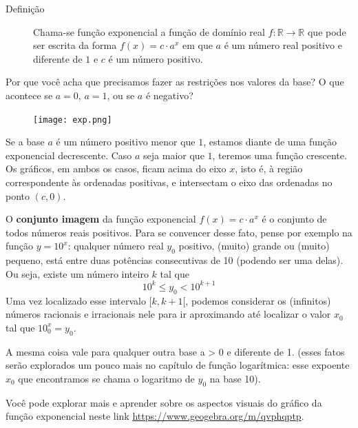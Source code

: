 \begin{description}
\item[Definição] Chama-se função exponencial a função de domínio real $f: \mathbb{R} \rightarrow \mathbb{R}$ que pode ser escrita da forma $f(x)= c \cdot a^{x}$ em que $a$ é um número real positivo e diferente de $1$ e $c$ é um número positivo.
\end{description}

\begin{reflection}

Por que você acha que precisamos  fazer as restrições nos valores da base? O que acontece se $a=0$, $a=1$, ou se $a$ é negativo?

\begin{figure}[H]
\centering
\texttt{[image: exp.png]}
\end{figure}

Se a base $a$ é um número positivo menor que $1$, estamos diante de uma função exponencial decrescente. Caso $a$ seja maior que $1$, teremos uma função crescente. Os gráficos, em ambos os casos, ficam acima do eixo $x$, isto é, à região correspondente às ordenadas positivas, e intersectam o eixo das ordenadas no ponto $(c,0)$.

O \textbf{conjunto imagem} da função exponencial $f(x) = c \cdot a^{x}$ é o conjunto de todos números reais positivos. Para se convencer desse fato, pense por exemplo na função $y = 10^x$: qualquer número real $y_0$ positivo, (muito) grande ou (muito) pequeno, está entre duas potências consecutivas de 10 (podendo ser uma delas). Ou seja, existe um número inteiro $k$ tal que
\[
10^k\leqslant y_0 <10^{k+1}
\]
Uma vez localizado esse intervalo $ [k,k+1[ $, podemos considerar os (infinitos) números racionais e irracionais nele para ir aproximando até localizar o valor $x_0$ tal que $10^x_0=y_0$. 

A mesma coisa vale para qualquer outra base a > 0 e diferente de 1. (esses fatos serão explorados um pouco mais no capítulo de função logarítmica: esse expoente $x_0$ que encontramos se chama o logaritmo de $y_0$ na base 10).

Você pode explorar mais e aprender sobre os aspectos visuais do gráfico da função exponencial neste link \url{https://www.geogebra.org/m/qvphqptp}.

\end{reflection}

